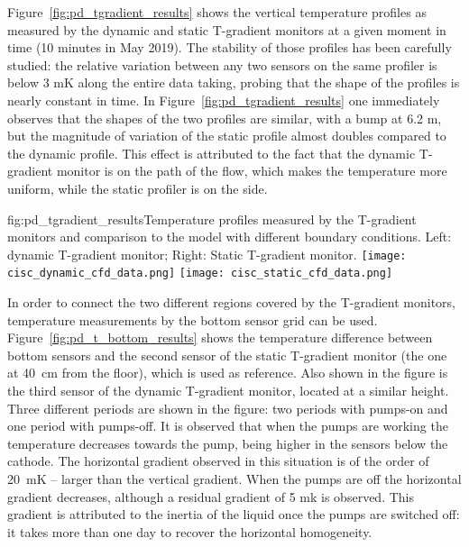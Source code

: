Figure~\ref{fig:pd_tgradient_results} shows the vertical temperature profiles as measured by the dynamic and static T-gradient monitors at a given moment in time (10 minutes in May 2019). The stability of those profiles has been carefully studied: the relative variation between any two sensors on the same profiler is below 3 mK along the entire data taking, probing that the shape of the profiles is nearly constant in time. In Figure~\ref{fig:pd_tgradient_results} one immediately observes that the shapes of the two profiles are similar, with a bump at 6.2 m, but the magnitude of %
variation of the static profile almost doubles %
compared to the dynamic profile. This effect is attributed to the fact that the dynamic T-gradient monitor is on the path of the \lar flow, which makes the temperature more uniform, while the static profiler is on the side.  

\begin{dunefigure}{fig:pd_tgradient_results}{Temperature profiles measured by the T-gradient monitors and comparison to the  model with different boundary conditions. Left: dynamic T-gradient monitor; Right: Static T-gradient monitor.}
  \texttt{[image: cisc\_dynamic\_cfd\_data.png]}%
  \texttt{[image: cisc\_static\_cfd\_data.png]}%
\end{dunefigure}

In order to connect the two different %
regions covered by the T-gradient monitors, temperature measurements by the bottom sensor grid can be used. Figure~\ref{fig:pd_t_bottom_results} shows the temperature difference between bottom sensors and the second sensor of the static T-gradient monitor (the one at 40~cm from the floor), which is used as reference. %
Also shown in the figure is the third sensor of the dynamic T-gradient monitor, located at a similar height. Three different periods are shown in the figure: two periods with pumps-on and one period with pumps-off. It is observed that when the pumps are working the temperature decreases towards the  pump, being  higher in the sensors below the cathode. The horizontal gradient observed in this situation is of the order of 20~mK -- larger than the vertical gradient. When the pumps are off the horizontal gradient decreases, although a residual gradient of 5 mk is observed. This gradient is attributed to the inertia of the liquid once the pumps are switched off: it takes more than one day to recover the horizontal homogeneity.    

